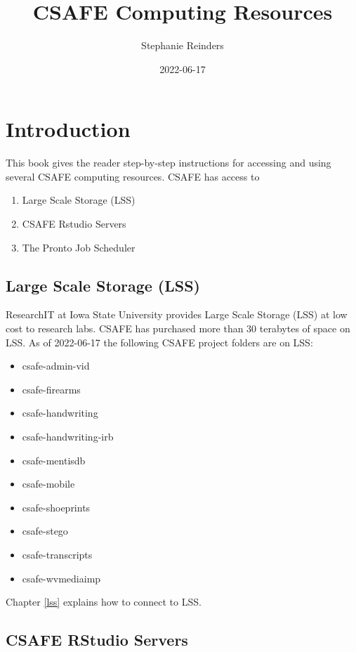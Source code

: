 \documentclass[
]{book}
\title{CSAFE Computing Resources}
\author{Stephanie Reinders}
\date{2022-06-17}
\providecommand{\tightlist}{%
  \setlength{\itemsep}{0pt}\setlength{\parskip}{0pt}}
\begin{document}
\maketitle

{
\setcounter{tocdepth}{1}
\tableofcontents
}
\hypertarget{introduction}{%
\chapter{Introduction}\label{introduction}}

This book gives the reader step-by-step instructions for accessing and using several CSAFE computing resources. CSAFE has access to

\begin{enumerate}
\def\labelenumi{\arabic{enumi}.}
\tightlist
\item
  Large Scale Storage (LSS)
\item
  CSAFE Rstudio Servers
\item
  The Pronto Job Scheduler
\end{enumerate}

\hypertarget{large-scale-storage-lss}{%
\section{Large Scale Storage (LSS)}\label{large-scale-storage-lss}}

ResearchIT at Iowa State University provides Large Scale Storage (LSS) at low cost to research labs. CSAFE has purchased more than 30 terabytes of space on LSS. As of 2022-06-17 the following CSAFE project folders are on LSS:

\begin{itemize}
\tightlist
\item
  csafe-admin-vid
\item
  csafe-firearms
\item
  csafe-handwriting
\item
  csafe-handwriting-irb
\item
  csafe-mentisdb
\item
  csafe-mobile
\item
  csafe-shoeprints
\item
  csafe-stego
\item
  csafe-transcripts
\item
  csafe-wvmediaimp
\end{itemize}

Chapter \ref{lss} explains how to connect to LSS.

\hypertarget{csafe-rstudio-servers}{%
\section{CSAFE RStudio Servers}\label{csafe-rstudio-servers}}
\end{document}
